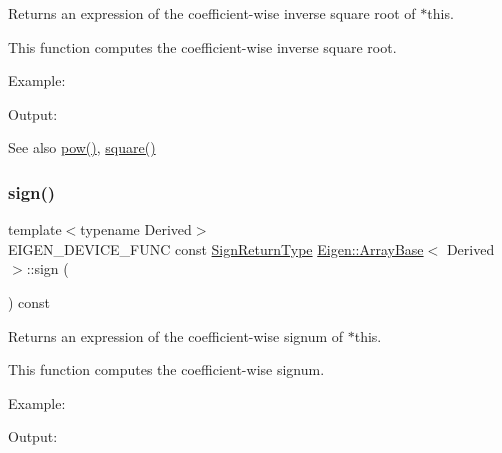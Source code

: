 \begin{DoxyReturn}{Returns}
an expression of the coefficient-\/wise inverse square root of $\ast$this.
\end{DoxyReturn}
This function computes the coefficient-\/wise inverse square root.

Example\+: 
\begin{DoxyCodeInclude}{0}
\end{DoxyCodeInclude}
 Output\+: 
\begin{DoxyVerbInclude}
\end{DoxyVerbInclude}


\begin{DoxySeeAlso}{See also}
\mbox{\hyperlink{class_eigen_1_1_array_base_ab6dc101d82e8228a19a8840e3a29c1c9}{pow()}}, \mbox{\hyperlink{class_eigen_1_1_array_base_a95c818b933d73944c53bf0226ea106c8}{square()}} 
\end{DoxySeeAlso}
\mbox{\label{class_eigen_1_1_array_base_a756077be83779c575e95deb4361a6dd6}} 
\subsubsection{\texorpdfstring{sign()}{sign()}}
{\footnotesize\ttfamily template$<$typename Derived$>$ \\
E\+I\+G\+E\+N\+\_\+\+D\+E\+V\+I\+C\+E\+\_\+\+F\+U\+NC const \mbox{\hyperlink{class_eigen_1_1_cwise_unary_op}{Sign\+Return\+Type}} \mbox{\hyperlink{class_eigen_1_1_array_base}{Eigen\+::\+Array\+Base}}$<$ Derived $>$\+::sign (\begin{DoxyParamCaption}{ }\end{DoxyParamCaption}) const\hspace{0.3cm}{\ttfamily [inline]}}

\begin{DoxyReturn}{Returns}
an expression of the coefficient-\/wise signum of $\ast$this.
\end{DoxyReturn}
This function computes the coefficient-\/wise signum.

Example\+: 
\begin{DoxyCodeInclude}{0}
\end{DoxyCodeInclude}
 Output\+: 
\begin{DoxyVerbInclude}
\end{DoxyVerbInclude}


